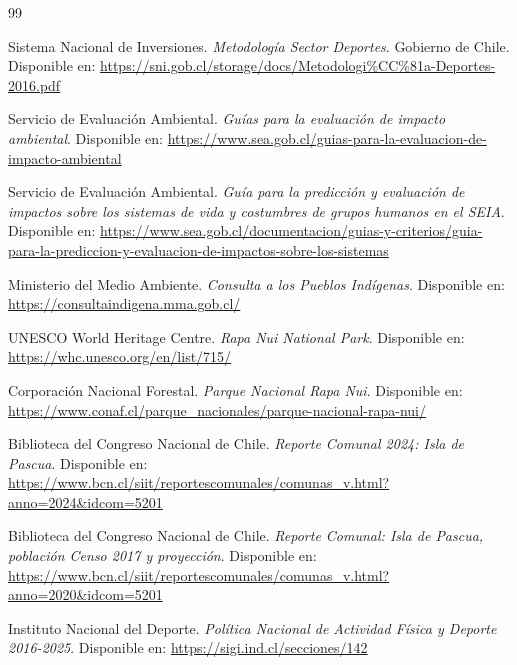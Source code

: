 \documentclass[12pt,letterpaper]{article}
\begin{document}
\newpage
\begin{thebibliography}{99}

Sistema Nacional de Inversiones. \textit{Metodología Sector Deportes}. Gobierno de Chile. Disponible en:
\url{https://sni.gob.cl/storage/docs/Metodologi%CC%81a-Deportes-2016.pdf}

Servicio de Evaluación Ambiental. \textit{Guías para la evaluación de impacto ambiental}. Disponible en:
\url{https://www.sea.gob.cl/guias-para-la-evaluacion-de-impacto-ambiental}

Servicio de Evaluación Ambiental. \textit{Guía para la predicción y evaluación de impactos sobre los sistemas de vida y costumbres de grupos humanos en el SEIA}. Disponible en:
\url{https://www.sea.gob.cl/documentacion/guias-y-criterios/guia-para-la-prediccion-y-evaluacion-de-impactos-sobre-los-sistemas}

Ministerio del Medio Ambiente. \textit{Consulta a los Pueblos Indígenas}. Disponible en:
\url{https://consultaindigena.mma.gob.cl/}

UNESCO World Heritage Centre. \textit{Rapa Nui National Park}. Disponible en:
\url{https://whc.unesco.org/en/list/715/}

Corporación Nacional Forestal. \textit{Parque Nacional Rapa Nui}. Disponible en:
\url{https://www.conaf.cl/parque_nacionales/parque-nacional-rapa-nui/}

Biblioteca del Congreso Nacional de Chile. \textit{Reporte Comunal 2024: Isla de Pascua}. Disponible en:
\url{https://www.bcn.cl/siit/reportescomunales/comunas_v.html?anno=2024&idcom=5201}

Biblioteca del Congreso Nacional de Chile. \textit{Reporte Comunal: Isla de Pascua, población Censo 2017 y proyección}. Disponible en:
\url{https://www.bcn.cl/siit/reportescomunales/comunas_v.html?anno=2020&idcom=5201}

Instituto Nacional del Deporte. \textit{Política Nacional de Actividad Física y Deporte 2016-2025}. Disponible en:
\url{https://sigi.ind.cl/secciones/142}

\end{thebibliography}
\end{document}
